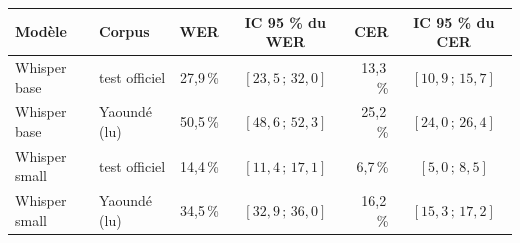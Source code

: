 \begin{tabular}{@{}llrcrc@{}}
\toprule
Modèle & Corpus & WER & IC 95 \% du WER & CER & IC 95 \% du CER \\
\midrule
Whisper base & test officiel & 27{,}9\,\% & $[23{,}5\,;\,32{,}0]$ & 13{,}3\,\% & $[10{,}9\,;\,15{,}7]$ \\
Whisper base & Yaoundé (lu) & 50{,}5\,\% & $[48{,}6\,;\,52{,}3]$ & 25{,}2\,\% & $[24{,}0\,;\,26{,}4]$ \\
Whisper small & test officiel & 14{,}4\,\% & $[11{,}4\,;\,17{,}1]$ & 6{,}7\,\% & $[5{,}0\,;\,8{,}5]$ \\
Whisper small & Yaoundé (lu) & 34{,}5\,\% & $[32{,}9\,;\,36{,}0]$ & 16{,}2\,\% & $[15{,}3\,;\,17{,}2]$ \\
\bottomrule
\end{tabular}

